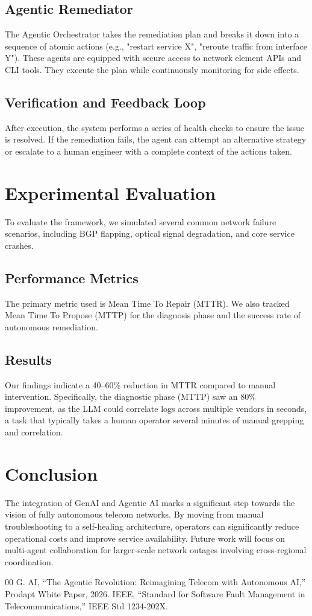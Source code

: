 \documentclass[conference]{IEEEtran}
\begin{document}
\subsection{Agentic Remediator}
The Agentic Orchestrator takes the remediation plan and breaks it down into a sequence of atomic actions (e.g., "restart service X", "reroute traffic from interface Y"). These agents are equipped with secure access to network element APIs and CLI tools. They execute the plan while continuously monitoring for side effects.

\subsection{Verification and Feedback Loop}
After execution, the system performs a series of health checks to ensure the issue is resolved. If the remediation fails, the agent can attempt an alternative strategy or escalate to a human engineer with a complete context of the actions taken.

\section{Experimental Evaluation}
To evaluate the framework, we simulated several common network failure scenarios, including BGP flapping, optical signal degradation, and core service crashes.

\subsection{Performance Metrics}
The primary metric used is Mean Time To Repair (MTTR). We also tracked Mean Time To Propose (MTTP) for the diagnosis phase and the success rate of autonomous remediation.

\subsection{Results}
Our findings indicate a 40--60\% reduction in MTTR compared to manual intervention. Specifically, the diagnostic phase (MTTP) saw an 80\% improvement, as the LLM could correlate logs across multiple vendors in seconds, a task that typically takes a human operator several minutes of manual grepping and correlation.

\section{Conclusion}
The integration of GenAI and Agentic AI marks a significant step towards the vision of fully autonomous telecom networks. By moving from manual troubleshooting to a self-healing architecture, operators can significantly reduce operational costs and improve service availability. Future work will focus on multi-agent collaboration for larger-scale network outages involving cross-regional coordination.

\begin{thebibliography}{00}
 G. AI, ``The Agentic Revolution: Reimagining Telecom with Autonomous AI,'' Prodapt White Paper, 2026.
 IEEE, ``Standard for Software Fault Management in Telecommunications,'' IEEE Std 1234-202X.
\end{thebibliography}
\end{document}
